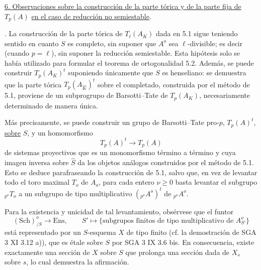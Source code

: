 
\medskip
\noindent
\underline{6. Observaciones sobre la construcción de la parte tórica y de
la parte fija de} $T_p(A)$ \underline{en el caso de reducción no
semiestable}.

\medskip
{}. La construcción de la parte tórica de $T_\ell(A_K)$ dada en 5.1
sigue teniendo sentido en cuanto $S$ es completo, sin suponer que
$A^o$ sea $\ell$-divisible; es decir (cuando $p=\ell$), sin suponer la
reducción semiestable. Esta hipótesis solo se había utilizado para
formular el teorema de ortogonalidad 5.2. Además, se puede construir
$T_p(A_K)^t$ suponiendo únicamente que $S$ es henseliano: se demuestra
que la parte tórica $T_p(A_{\widehat K})^t$ sobre el completado,
construida por el método de 5.1, proviene de un subprogrupo de
Barsotti--Tate de $T_p(A_K)$, necesariamente determinado de manera
única.

Más precisamente, se puede construir un grupo de Barsotti--Tate
pro-$p$, $T_p(A)^t$, \underline{sobre} $S$, y un homomorfismo
\[
 T_p(A)^t\longrightarrow T_p(A)
\]
de sistemas proyectivos que es un monomorfismo término a término y cuya
imagen inversa sobre $\widehat S$ da los objetos análogos construidos
por el método de 5.1. Esto se deduce parafraseando la construcción de
5.1, salvo que, en vez de levantar todo el toro maximal $T_o$ de $A_o$,
para cada entero $\nu\geq0$ basta levantar el subgrupo
${}_{p^\nu}T_o$ a un subgrupo de tipo multiplicativo
$({}_{p^\nu}A^o)^t$ de ${}_{p^\nu}A^o$.


Para la existencia y unicidad de tal levantamiento, obsérvese que el
funtor
\[
 (\mathrm{Sch})^o_{/S}\longrightarrow\mathrm{Ens},
 \qquad
 S'\longmapsto
 \{\text{subgrupos finitos de tipo multiplicativo de }A^o_{S'}\}
\]
está representado por un $S$-esquema $X$ de tipo finito (cf. la
demostración de SGA 3 XI 3.12 a)), que es étale sobre $S$ por SGA 3 IX
3.6 bis. En consecuencia, existe exactamente una sección de $X$ sobre
$S$ que prolonga una sección dada de $X_s$ sobre $s$, lo cual demuestra
la afirmación.

